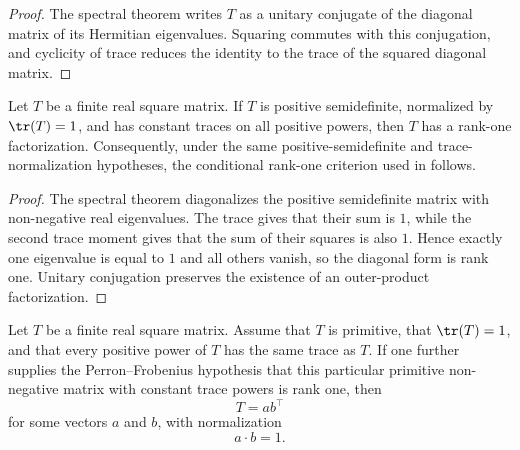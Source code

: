 \begin{proof}
    \leanok
    The spectral theorem writes $T$ as a unitary conjugate of the diagonal
    matrix of its Hermitian eigenvalues. Squaring commutes with this conjugation,
    and cyclicity of trace reduces the identity to the trace of the squared
    diagonal matrix.
\end{proof}

\begin{theorem}
    \label{thm:matrix_psd_trace_power_rank_one}
    \leanok
    Let $T$ be a finite real square matrix. If $T$ is positive semidefinite,
    normalized by $\tr(T)=1$, and has constant traces on all positive powers,
    then $T$ has a rank-one factorization. Consequently, under the same
    positive-semidefinite and trace-normalization hypotheses, the conditional
    rank-one criterion used in \cite[Lemma~C.5]{Cirac2016MPDO_arXiv} follows.
\end{theorem}

\begin{proof}
    \leanok
    The spectral theorem diagonalizes the positive semidefinite matrix with
    non-negative real eigenvalues. The trace gives that their sum is $1$, while
    the second trace moment gives that the sum of their squares is also $1$.
    Hence exactly one eigenvalue is equal to $1$ and all others vanish, so the
    diagonal form is rank one. Unitary conjugation preserves the existence of an
    outer-product factorization.
\end{proof}

\begin{theorem}
    \label{thm:sal_zcl_implies_rank_one_t}
    \leanok
    Let $T$ be a finite real square matrix. Assume that $T$ is primitive,
    that $\tr(T) = 1$, and that every positive power of $T$ has the same trace
    as $T$. If one further supplies the Perron--Frobenius hypothesis that
    this particular primitive non-negative matrix with constant trace powers is
    rank one, then
    \[
        T = a b^\top
    \]
    for some vectors $a$ and $b$, with normalization
    \[
        a \cdot b = 1.
    \]
\end{theorem}

